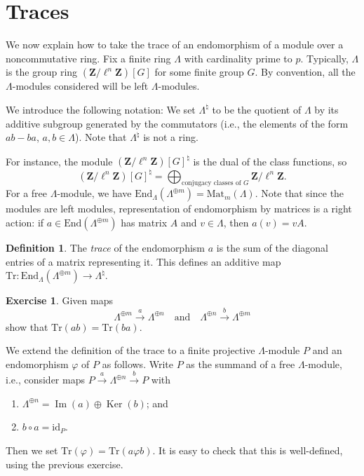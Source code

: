 \documentclass{stacks-project}
\theoremstyle{plain}
\theoremstyle{definition}
\newtheorem{definition}[subsection]{Definition}
\newtheorem{exercise}[subsection]{Exercise}
\theoremstyle{remark}
\numberwithin{equation}{subsection}
\def\Ker{\mathop{\mathrm{Ker}}}
\def\Im{\mathop{\mathrm{Im}}}
\begin{document}
\section{Traces}
\label{section-traces}

\noindent
We now explain how to take the trace of an endomorphism of a module over a
noncommutative ring. Fix a finite ring $\Lambda$ with cardinality prime to $p$.
Typically, $\Lambda$ is the group ring $(\mathbf{Z}/\ell^n\mathbf{Z})[G]$ for
some finite group $G$. By convention, all the $\Lambda$-modules considered will
be left $\Lambda$-modules.

\medskip\noindent
We introduce the following notation:
We set $\Lambda^\natural$ to be the quotient of $\Lambda$ by its additive
subgroup generated by the commutators (i.e., the elements of the form
$ab-ba$, $a, b \in \Lambda$). Note that $\Lambda^\natural$ is not a ring.

\medskip\noindent
For instance, the module $(\mathbf{Z}/\ell^n\mathbf{Z})[G]^\natural$ is the
dual of the class functions, so
$$
(\mathbf{Z}/\ell^n\mathbf{Z})[G]^\natural
=
\bigoplus\nolimits_{\text{conjugacy classes of }G}
\mathbf{Z}/\ell^n\mathbf{Z}.
$$
For a free $\Lambda$-module, we have $\text{End}_\Lambda(\Lambda^{\oplus m}) =
\text{Mat}_m(\Lambda)$. Note that since the modules are left modules,
representation of endomorphism by matrices is a right action: if $a \in
\text{End}(\Lambda^{\oplus m})$ has matrix $A$ and $v \in \Lambda$, then $a(v)
= v A$.

\begin{definition}
\label{definition-trace}
The {\it trace} of the endomorphism $a$ is the sum of the diagonal entries of
a matrix representing it. This defines an additive map $\text{Tr} :
\text{End}_\Lambda(\Lambda^{\oplus m}) \to \Lambda^\natural$.
\end{definition}

\begin{exercise}
\label{exercise-trace-is-trace}
Given maps
$$
\Lambda^{\oplus m} \xrightarrow{a} \Lambda^{\oplus n}
\quad\text{and}\quad
\Lambda^{\oplus n} \xrightarrow{b} \Lambda^{\oplus m}
$$
show that $\text{Tr}(ab) = \text{Tr}(ba)$.
\end{exercise}

\noindent
We extend the definition of the trace to a finite projective $\Lambda$-module
$P$ and an endomorphism $\varphi$ of $P$ as follows. Write $P$ as the summand
of a free $\Lambda$-module, i.e., consider maps $P \xrightarrow{a}
\Lambda^{\oplus n} \xrightarrow{b} P$ with
\begin{enumerate}
\item
$\Lambda^{\oplus n} = \Im(a) \oplus \Ker(b)$; and
\item
$b\circ a = \text{id}_P$.
\end{enumerate}
Then we set $\text{Tr}(\varphi) = \text{Tr}(a\varphi b)$. It is easy to check
that this is well-defined, using the previous exercise.
\end{document}
